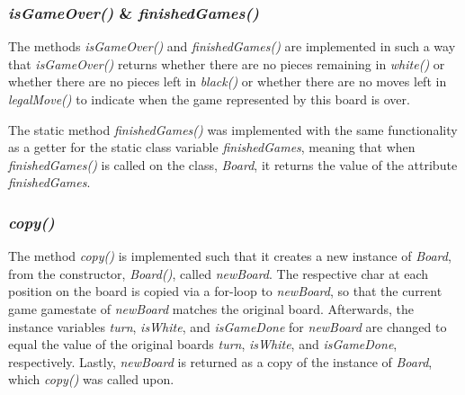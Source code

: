 \documentclass[12pt, a4paper]{article}
\begin{document}
\subsubsection{\emph{isGameOver()} \& \emph{finishedGames()}}
The methods \emph{isGameOver()} and \emph{finishedGames()} are implemented in such a way that \emph{isGameOver()} returns whether there are no pieces remaining in \emph{white()} or whether there are no pieces left in \emph{black()} or whether there are no moves left in \emph{legalMove()} to indicate when the game represented by this board is over. \par
The static method \emph{finishedGames()} was implemented with the same functionality as a getter for the static class variable \emph{finishedGames}, meaning that when \emph{finishedGames()} is called on the class, \emph{Board}, it returns the value of the attribute \emph{finishedGames}.

\subsubsection{\emph{copy()}}
The method \emph{copy()} is implemented such that it creates a new instance of \emph{Board}, from the constructor, \emph{Board()}, called \emph{newBoard}. The respective char at each position on the board is copied via a for-loop to \emph{newBoard}, so that the current game gamestate of \emph{newBoard} matches the original board. Afterwards, the instance variables \emph{turn}, \emph{isWhite}, and \emph{isGameDone} for \emph{newBoard} are changed to equal the value of the original boards \emph{turn}, \emph{isWhite}, and \emph{isGameDone}, respectively. Lastly, \emph{newBoard} is returned as a copy of the instance of \emph{Board}, which \emph{copy()} was called upon. \par
\end{document}
